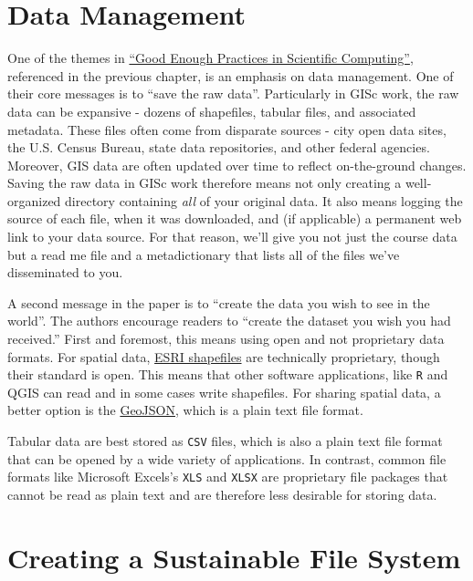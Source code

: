 \documentclass[]{book}
\theoremstyle{definition}
\theoremstyle{definition}
\theoremstyle{definition}
\theoremstyle{remark}
\begin{document}
\section{Data Management}\label{data-management}

One of the themes in \href{https://arxiv.org/abs/1609.00037}{``Good
Enough Practices in Scientific Computing''}, referenced in the previous
chapter, is an emphasis on data management. One of their core messages
is to ``save the raw data''. Particularly in GISc work, the raw data can
be expansive - dozens of shapefiles, tabular files, and associated
metadata. These files often come from disparate sources - city open data
sites, the U.S. Census Bureau, state data repositories, and other
federal agencies. Moreover, GIS data are often updated over time to
reflect on-the-ground changes. Saving the raw data in GISc work
therefore means not only creating a well-organized directory containing
\emph{all} of your original data. It also means logging the source of
each file, when it was downloaded, and (if applicable) a permanent web
link to your data source. For that reason, we'll give you not just the
course data but a read me file and a metadictionary that lists all of
the files we've disseminated to you.

A second message in the paper is to ``create the data you wish to see in
the world''. The authors encourage readers to ``create the dataset you
wish you had received.'' First and foremost, this means using open and
not proprietary data formats. For spatial data,
\href{https://en.wikipedia.org/wiki/Shapefile}{ESRI shapefiles} are
technically proprietary, though their standard is open. This means that
other software applications, like \texttt{R} and QGIS can read and in
some cases write shapefiles. For sharing spatial data, a better option
is the \href{https://en.wikipedia.org/wiki/GeoJSON}{GeoJSON}, which is a
plain text file format.

Tabular data are best stored as \texttt{CSV} files, which is also a
plain text file format that can be opened by a wide variety of
applications. In contrast, common file formats like Microsoft Excels's
\texttt{XLS} and \texttt{XLSX} are proprietary file packages that cannot
be read as plain text and are therefore less desirable for storing data.

\section{Creating a Sustainable File
System}\label{creating-a-sustainable-file-system}
\end{document}
